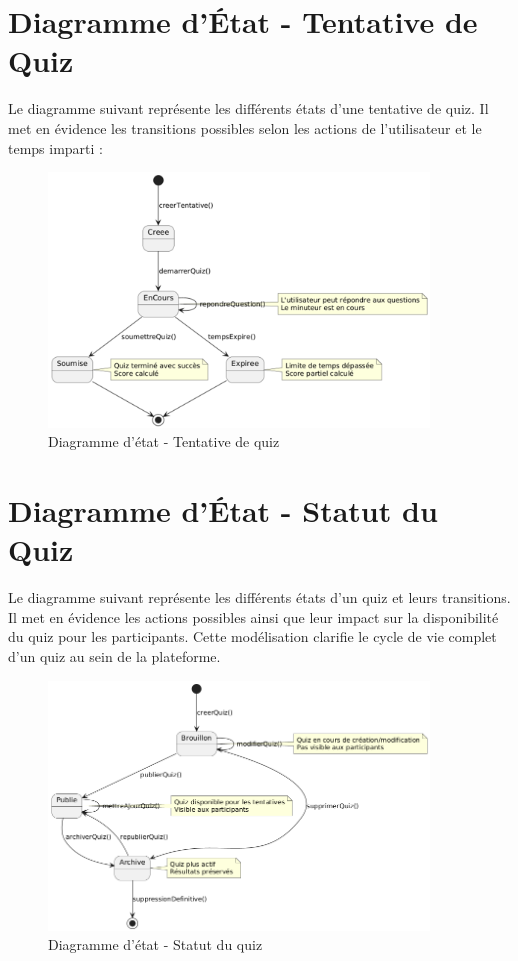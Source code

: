 \documentclass[12pt,a4paper]{report}
\begin{document}
\section{Diagramme d'État - Tentative de Quiz}

Le diagramme suivant représente les différents états d'une tentative de quiz. Il met en évidence les transitions possibles selon les actions de l'utilisateur et le temps imparti :

\begin{figure}[H]
\centering
\includegraphics[width=0.9\textwidth]{latex_media/media/image21.png}
\caption{Diagramme d'état - Tentative de quiz}
\label{fig:diagramme-etat-tentative}
\end{figure}

\section{Diagramme d'État - Statut du Quiz}

Le diagramme suivant représente les différents états d'un quiz et leurs transitions. Il met en évidence les actions possibles ainsi que leur impact sur la disponibilité du quiz pour les participants. Cette modélisation clarifie le cycle de vie complet d'un quiz au sein de la plateforme.

\begin{figure}[H]
\centering
\includegraphics[width=0.9\textwidth]{latex_media/media/image22.png}
\caption{Diagramme d'état - Statut du quiz}
\label{fig:diagramme-etat-quiz}
\end{figure}
\end{document}
